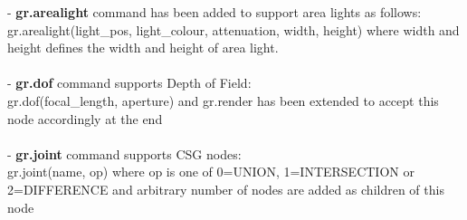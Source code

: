 \documentclass {article}
\begin{document}
\begin{description}
- {\bf gr.arealight} command has been added to support area lights as follows:\\
gr.arealight(light\_pos, light\_colour, attenuation, width, height) where width and height defines the width and height of area light.\\\\
- {\bf gr.dof} command supports Depth of Field:\\
gr.dof(focal\_length, aperture) and gr.render has been extended to accept this node accordingly at the end\\\\
- {\bf gr.joint} command supports CSG nodes:\\
gr.joint(name, op) where op is one of 0=UNION, 1=INTERSECTION or 2=DIFFERENCE and arbitrary number of nodes are added as children of this node\\\\

\end{description}
\end{document}
